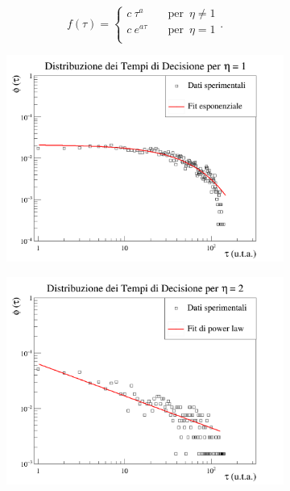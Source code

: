 \documentclass[letterpaper,10pt]{article}
\begin{document}
\begin{equation}
f(\tau)=\begin{cases}
          c \ \tau ^{a} \quad &\text{per } \, \eta \neq 1 \\
          c \ e^{a \tau} \quad &\text{per } \, \eta = 1 \\
     \end{cases} .
\label{Eq:13}
\end{equation}

\begin{figure}[h]
\centering
\begin{subfigure}{0.8\textwidth}
\includegraphics[width=\linewidth]{Immagini/partial_time_graph_v1.png}
\end{subfigure}
\begin{subfigure}{0.8\textwidth}
\includegraphics[width=\linewidth]{Immagini/partial_time_graph_v2.png}
\end{subfigure}
\end{figure}
\end{document}
